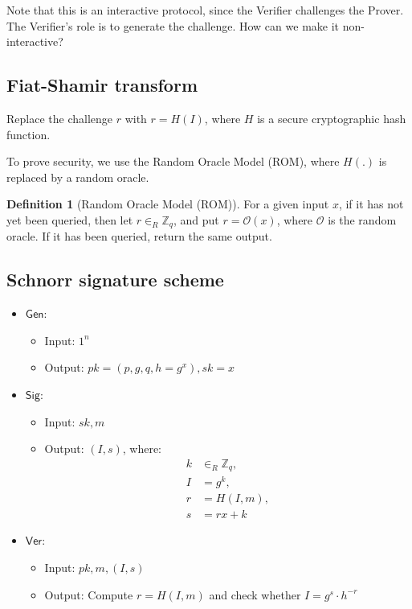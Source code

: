 \documentclass[11pt]{article}
\theoremstyle{definition}
\newtheorem{definition}{Definition}[section]
\theoremstyle{proof}
\newcommand{\Gen}{\mathsf{Gen}}
\newcommand{\Sig}{\mathsf{Sig}}
\newcommand{\Ver}{\mathsf{Ver}}
\begin{document}
Note that this is an interactive protocol, since the Verifier challenges the Prover. The Verifier's role is to generate the challenge. How can we make it non-interactive?

\subsection{Fiat-Shamir transform}

Replace the challenge $r$ with $r = H(I)$, where $H$ is a secure cryptographic hash function.

\noindent To prove security, we use the Random Oracle Model (ROM), where $H(.)$ is replaced by a random oracle.

\begin{definition}[Random Oracle Model (ROM)]
	For a given input $x$, if it has not yet been queried, then let $r \in_R \mathbb{Z}_q$, and put $r = \mathcal{O}(x)$, where $\mathcal{O}$ is the random oracle. If it has been queried, return the same output.
\end{definition}

\subsection{Schnorr signature scheme}

\begin{itemize}
	\item $\Gen$:
	\begin{itemize}
		\item Input: $1^n$
		\item Output: $pk = (p, g, q, h = g^x), sk = x$
	\end{itemize}
	\item $\Sig$:
	\begin{itemize}
		\item Input: $sk, m$
		\item Output: $(I, s)$, where:
		\begin{align}
			k &\in_R \mathbb{Z}_q, \\
			I &= g^k, \\
			r &= H(I, m), \\
			s &= rx + k
		\end{align}
	\end{itemize}
	\item $\Ver$:
	\begin{itemize}
		\item Input: $pk, m, (I, s)$
		\item Output: Compute $r = H(I, m)$ and check whether $I = g^s \cdot h^{-r}$
	\end{itemize}
\end{itemize}
\end{document}
